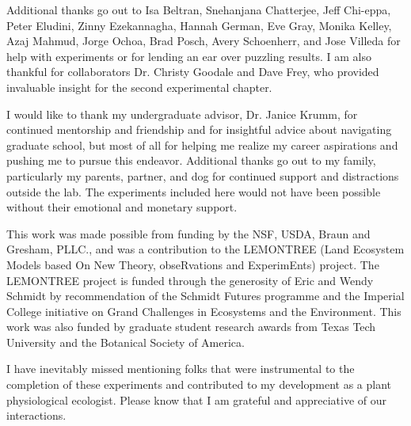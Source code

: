 \documentclass{ttuthes2007}
\begin{document}
Additional thanks go out to Isa Beltran, Snehanjana Chatterjee, Jeff Chi-eppa, Peter Eludini, Zinny Ezekannagha, Hannah German, Eve Gray, Monika Kelley, Azaj Mahmud, Jorge Ochoa, Brad Posch, Avery Schoenherr, and Jose Villeda for help with experiments or for lending an ear over puzzling results. I am also thankful for collaborators Dr. Christy Goodale and Dave Frey, who provided invaluable insight for the second experimental chapter.

I would like to thank my undergraduate advisor, Dr. Janice Krumm, for continued mentorship and friendship and for insightful advice about navigating graduate school, but most of all for helping me realize my career aspirations and pushing me to pursue this endeavor. Additional thanks go out to my family, particularly my parents, partner, and dog for continued support and distractions outside the lab. The experiments included here would not have been possible without their emotional and monetary support.

This work was made possible from funding by the NSF, USDA, Braun and Gresham, PLLC., and was a contribution to the LEMONTREE (Land Ecosystem Models based On New Theory, obseRvations and ExperimEnts) project. The LEMONTREE project is funded through the generosity of Eric and Wendy Schmidt by recommendation of the Schmidt Futures programme and the Imperial College initiative on Grand Challenges in Ecosystems and the Environment. This work was also funded by graduate student research awards from Texas Tech University and the Botanical Society of America.

I have inevitably missed mentioning folks that were instrumental to the completion of these experiments and contributed to my development as a plant physiological ecologist. Please know that I am grateful and appreciative of our interactions.

\newpage
\begin{singlespace}
\tableofcontents
\end{singlespace}

\end{document}
